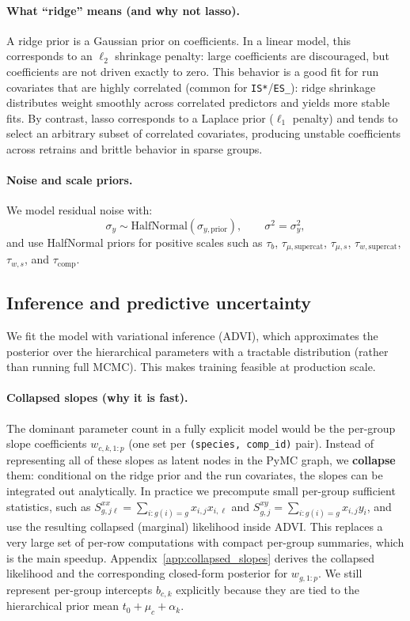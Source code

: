 \documentclass[11pt]{article}
\begin{document}
\paragraph{What ``ridge'' means (and why not lasso).}
A ridge prior is a Gaussian prior on coefficients. In a linear model, this corresponds to an $\ell_2$ shrinkage penalty:
large coefficients are discouraged, but coefficients are not driven exactly to zero.
This behavior is a good fit for run covariates that are highly correlated (common for \texttt{IS*}/\texttt{ES\_\*}):
ridge shrinkage distributes weight smoothly across correlated predictors and yields more stable fits.
By contrast, lasso corresponds to a Laplace prior ($\ell_1$ penalty) and tends to select an arbitrary subset of
correlated covariates, producing unstable coefficients across retrains and brittle behavior in sparse groups.

\paragraph{Noise and scale priors.}
We model residual noise with:
\[
  \sigma_y \sim \mathrm{HalfNormal}(\sigma_{y,\mathrm{prior}}), \qquad \sigma^2 = \sigma_y^2,
\]
and use HalfNormal priors for positive scales such as $\tau_b$, $\tau_{\mu,\mathrm{supercat}}$, $\tau_{\mu,s}$,
$\tau_{w,\mathrm{supercat}}$, $\tau_{w,s}$, and $\tau_{\mathrm{comp}}$.

\subsection{Inference and predictive uncertainty}

We fit the model with variational inference (ADVI), which approximates the posterior over the hierarchical parameters
with a tractable distribution (rather than running full MCMC). This makes training feasible at production scale.

\paragraph{Collapsed slopes (why it is fast).}
The dominant parameter count in a fully explicit model would be the per-group slope coefficients $w_{c,k,1:p}$
(one set per \texttt{(species, comp\_id)} pair). Instead of representing all of these slopes as latent nodes in the PyMC
graph, we \textbf{collapse} them: conditional on the ridge prior and the run covariates, the slopes can be integrated out
analytically. In practice we precompute small per-group sufficient statistics, such as
$S^{xx}_{g,j\ell}=\sum_{i:g(i)=g} x_{i,j}x_{i,\ell}$ and $S^{xy}_{g,j}=\sum_{i:g(i)=g} x_{i,j}y_i$, and use the resulting
collapsed (marginal) likelihood inside ADVI. This replaces a very large set of per-row computations with compact per-group
summaries, which is the main speedup.
Appendix~\ref{app:collapsed_slopes} derives the collapsed likelihood and the corresponding closed-form posterior for
$w_{g,1:p}$.
We still represent per-group intercepts $b_{c,k}$ explicitly because they are tied to the hierarchical prior mean
$t_0+\mu_c+\alpha_k$.
\end{document}
